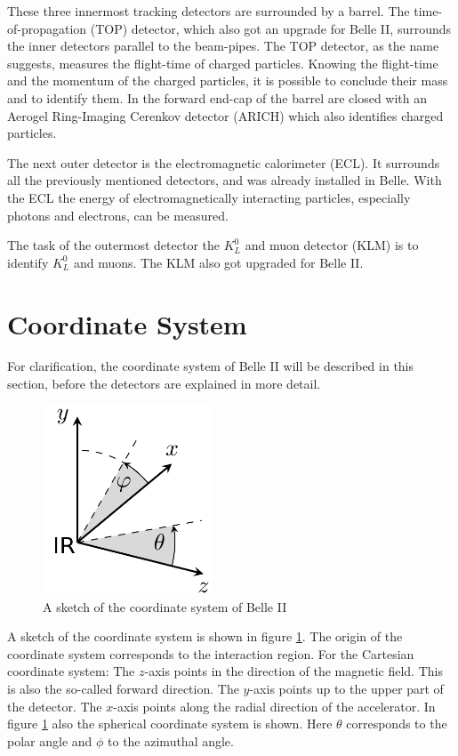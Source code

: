 \documentclass[a4paper,11pt,twosided,final,german,openbib,pdftex,listof=totoc,bibliography=totoc]{scrbook}
\begin{document}
These three innermost tracking detectors are surrounded by a barrel. The time-of-propagation (TOP) detector, which also got an upgrade for Belle II, surrounds the inner detectors parallel to the beam-pipes. The TOP detector, as the name suggests, measures the flight-time of charged particles. Knowing the flight-time and the momentum of the charged particles, it is possible to conclude their mass and to identify them. In the forward end-cap of the barrel are closed with an Aerogel Ring-Imaging Cerenkov detector (ARICH) which also identifies charged particles.

The next outer detector is the electromagnetic calorimeter (ECL). It surrounds all the previously mentioned detectors, and was already installed in Belle. With the ECL the energy of electromagnetically interacting particles, especially photons and electrons, can be measured.

The task of the outermost detector the $K_L^0$ and muon detector (KLM) is to identify $K_L^0$ and muons. The KLM also got upgraded for Belle II. \cite{B2B} 

\section{Coordinate System}

For clarification, the coordinate system of Belle II will be described in this section, before the detectors are explained in more detail.

\begin{figure}[h!]
	\begin{center}
		\includegraphics[width=5cm]{Bilder/coordinate.png}
	\end{center}
	\caption[Coordinate System Of Belle II]{A sketch of the coordinate system of Belle II}
	\label{fig:CoordinateSysytem}
\end{figure}

A sketch of the coordinate system is shown in figure \ref{fig:CoordinateSysytem}. The origin of the coordinate system corresponds to the interaction region. For the Cartesian coordinate system: The $z$-axis points in the direction of the magnetic field. This is also the so-called forward direction. The $y$-axis points up to the upper part of the detector. The $x$-axis points along the radial direction of the accelerator. In figure \ref{fig:CoordinateSysytem} also the spherical coordinate system is shown. Here $\theta$ corresponds to the polar angle and $\phi$ to the azimuthal angle.\cite{DevelopVertex}
\end{document}
